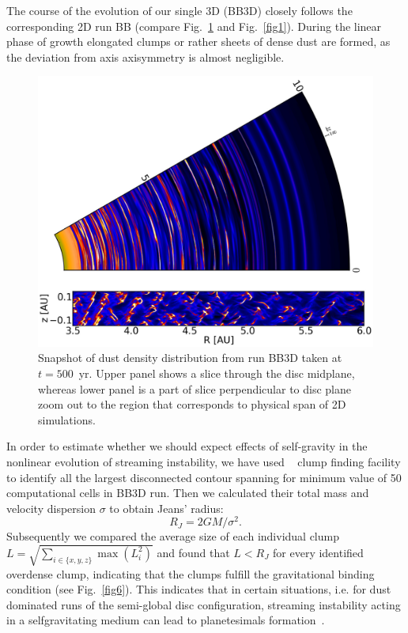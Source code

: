The course of the evolution of our single 3D (BB3D) closely follows the
corresponding 2D run BB (compare Fig.~\ref{fig5} and Fig.~\ref{fig1}). During
the linear phase of growth elongated clumps or rather sheets of dense dust are
formed, as the deviation from axis axisymmetry is almost negligible.
%
\begin{figure}
   \includegraphics[width=0.98\linewidth]{figures/fig5}
   \caption{Snapshot of dust density distribution from run BB3D taken at
   $t=500$~yr. Upper panel shows a slice through the disc midplane, whereas lower
   panel is a part of slice perpendicular to disc plane zoom out to the region
   that corresponds to physical span of 2D simulations.}
   \label{fig5}
\end{figure}
In order to estimate whether we should expect effects of self-gravity  in the
nonlinear evolution of streaming instability, we have used \yt{}~\citep{yt} clump
finding facility to identify all the largest disconnected contour spanning for
minimum value of 50 computational cells in BB3D run. Then we calculated their
total mass and velocity dispersion $\sigma$ to obtain Jeans' radius:
%
\begin{equation}
   R_J = 2 GM / \sigma^2.
\end{equation}
Subsequently we compared the average size of each individual clump $L =
\sqrt{\sum_{i\in{\{x,y,z\}}} \max (L_i^2)}$ and found that $L < R_J$ for every
identified overdense clump, indicating that the clumps fulfill the gravitational
binding condition (see Fig.~\ref{fig6}). This indicates that in certain
situations, i.e. for dust dominated runs of the semi-global disc configuration,
streaming instability acting in a selfgravitating medium can lead to planetesimals
formation~\citep{J07}.

